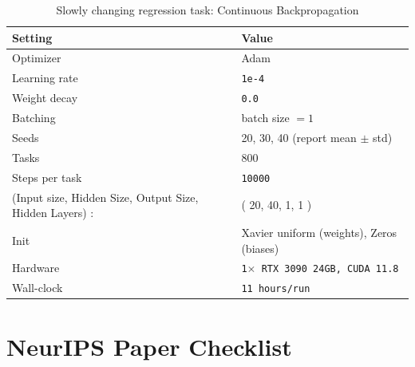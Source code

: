 \documentclass{article}
\begin{document}
\begin{table}[H]
\centering
\footnotesize
\caption{Slowly changing regression task: Continuous Backpropagation}
\label{tab:scr_cbp}
\begin{tabular}{@{}ll@{}}
\toprule
Setting & Value \\ \midrule
Optimizer & Adam \\
Learning rate & \texttt{1e-4} \\
Weight decay & \texttt{0.0} \\
Batching & batch size $=1$ \\
Seeds & 20, 30, 40 (report mean $\pm$ std) \\
Tasks & 800 \\
Steps per task & \texttt{10000} \\
(Input size, Hidden Size, Output Size, Hidden Layers) : & ( 20, 40, 1, 1 ) \\ 
Init & Xavier uniform (weights), Zeros (biases)\\
Hardware & \texttt{1$\times$ RTX 3090 24GB, CUDA 11.8} \\
Wall-clock & \texttt{11 hours/run} \\
\bottomrule
\end{tabular}
\end{table}



\newpage
\section*{NeurIPS Paper Checklist}
\end{document}
